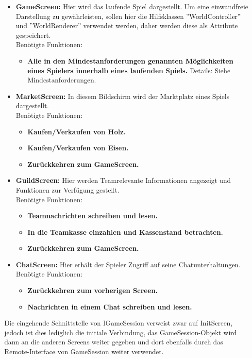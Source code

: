 \documentclass[fontsize=12pt,paper=a4,twoside]{scrartcl}
\begin{document}
\begin{itemize}
\item \textbf{GameScreen:}
Hier wird das laufende Spiel dargestellt. Um eine einwandfreie Darstellung zu gewährleisten, sollen hier die Hilfsklassen ''WorldController'' und ''WorldRenderer'' verwendet werden, daher werden diese als Attribute gespeichert.\\ Benötigte Funktionen:
\begin{itemize}
	\item \textbf{Alle in den Mindestanforderungen genannten Möglichkeiten eines Spielers innerhalb eines laufenden Spiels.} Details: Siehe Mindestanforderungen.
\end{itemize}

\item \textbf{MarketScreen:}
In diesem Bildschirm wird der Marktplatz eines Spiels dargestellt.\\ Benötigte Funktionen:
\begin{itemize}
	\item \textbf{Kaufen/Verkaufen von Holz.}
	\item \textbf{Kaufen/Verkaufen von Eisen.}
	\item \textbf{Zurückkehren zum GameScreen.}
\end{itemize}

\item \textbf{GuildScreen:}
Hier werden Teamrelevante Informationen angezeigt und Funktionen zur Verfügung gestellt.\\ Benötigte Funktionen:
\begin{itemize}
	\item \textbf{Teamnachrichten schreiben und lesen.}
	\item \textbf{In die Teamkasse einzahlen und Kassenstand betrachten.}
	\item \textbf{Zurückkehren zum GameScreen.}
\end{itemize}

\item \textbf{ChatScreen:}
Hier erhält der Spieler Zugriff auf seine Chatunterhaltungen.\\ Benötigte Funktionen:
\begin{itemize}
	\item \textbf{Zurückkehren zum vorherigen Screen.}
	\item \textbf{Nachrichten in einem Chat schreiben und lesen.}
\end{itemize}
\end{itemize}


Die eingehende Schnittstelle von IGameSession verweist zwar auf InitScreen, jedoch ist dies lediglich die initiale Verbindung, das GameSession-Objekt wird dann an die anderen Screens weiter gegeben und dort ebenfalls durch das Remote-Interface von GameSession weiter verwendet.
\end{document}
